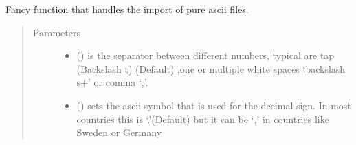 \documentclass[letterpaper,10pt,english]{sphinxmanual}
\begin{document}
\begin{fulllineitems}
\begin{fulllineitems}
\begin{description}
\end{description}

\end{fulllineitems}


\begin{fulllineitems}
\label{\detokenize{plot_func:plot_func.TA.__read_ascii_data}}
Fancy function that handles the import of pure ascii files.
\begin{quote}\begin{description}
\item[{Parameters}] \leavevmode\begin{itemize}
\item {} 
 (\sphinxstyleliteralemphasis{\sphinxupquote{ (}}\sphinxstyleliteralemphasis{\sphinxupquote{)}}) \textendash{} is the separator between different numbers, typical are tap (Backslash t) (Default) ,one or
multiple white spaces ‘backslash s+’ or comma ‘,’.

\item {} 
 (\sphinxstyleliteralemphasis{\sphinxupquote{ (}}\sphinxstyleliteralemphasis{\sphinxupquote{)}}) \textendash{} sets the ascii symbol that is used for the decimal sign. In most countries this is ‘.’(Default)
but it can be ‘,’ in countries like Sweden or Germany


\end{itemize}
\end{description}
\end{quote}
\end{fulllineitems}
\end{fulllineitems}
\end{document}

